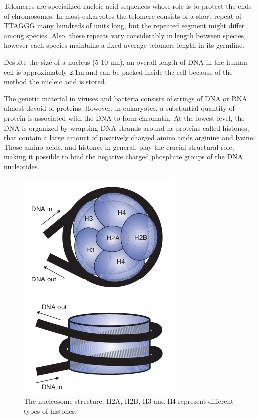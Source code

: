 Telomeres are specialized nucleic acid sequences whose role is to protect the ends of chromosomes.
In most eukaryotes the telomere consists of a short repeat of TTAGGG many hundreds of units long, but the repeated segment might differ among species.
Also, these repeats vary considerably in length between species, however each species maintains a fixed average telomere length in its germline.

Despite the size of a nucleus (5-10 um), an overall length of DNA in the human cell is approximately 2.1m and can be packed inside the cell because of the method the nucleic acid is stored. 


The genetic material in viruses and bacteria consists of strings of DNA or RNA almost devoid of proteins. 
However, in eukaryotes, a substantial quantity of protein is associated with the DNA to form chromatin. 
At the lowest level, the DNA is organized by wrapping DNA strands around he proteins called histones, that contain a large amount of positively charged amino acids arginine and lysine. 
Those amino acids, and histones in general, play the crucial structural role, making it possible to bind the negative charged phosphate groups of the DNA nucleotides.

\begin{figure}[!ht]
	\centering
	\includegraphics[width=.5\textwidth]{figures/nucleoDetailed}
	\caption{The nucleosome structure. H2A, H2B, H3 and H4 represent different types of histones. \label{o:latex_friendly_zone}}
\end{figure}

